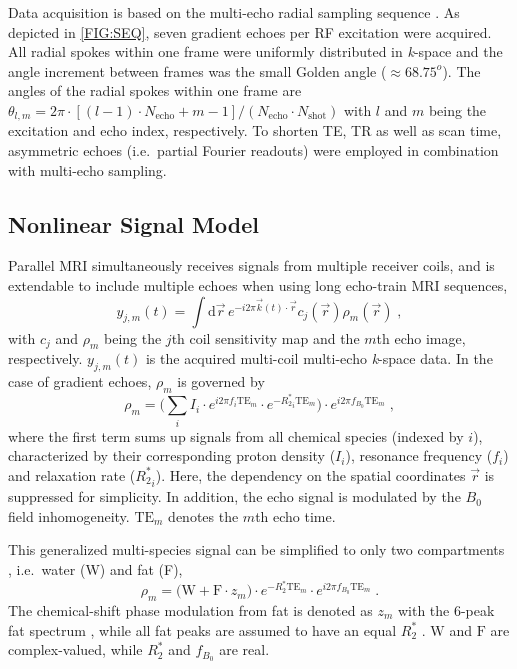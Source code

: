 \documentclass[journal,twoside,web]{ieeecolor}
\begin{document}
Data acquisition is based on the multi-echo radial sampling sequence 
\cite{tan_2019_mobawf}. 
As depicted in \cref{FIG:SEQ}, seven gradient echoes per RF excitation 
were acquired. 
All radial spokes within one frame were uniformly distributed in \textit{k}-space 
and the angle increment between frames was the small Golden angle 
\cite{winkelmann_2007_golden} ($\approx 68.75^o$).
The angles of the radial spokes within one frame are 
$\theta_{l,m} = 2\pi \cdot [ (l-1) \cdot N_\text{echo} + m - 1 ] / (N_\text{echo} \cdot N_\text{shot})$ 
with $l$ and $m$ being the excitation and echo index, respectively. 
To shorten TE, TR as well as scan time, 
asymmetric echoes (i.e.~partial Fourier readouts) \cite{untenberger_2016_asym} 
were employed in combination with multi-echo sampling.



\subsection{Nonlinear Signal Model}

Parallel MRI \cite{roemer_1990_pi,pruessmann_1999_sense,griswold_2002_grappa} 
simultaneously receives signals from multiple receiver coils, 
and is extendable to include multiple echoes when using long echo-train MRI sequences,
\begin{equation} \label{EQU:y_pimeco}
y_{j,m}(t) = \int \text{d} \vec{r} \, e^{-i 2\pi \vec{k} (t) \cdot \vec{r} } c_j(\vec{r}) \rho_m(\vec{r}) \;,
\end{equation}
with $c_j$ and $\rho_m$ being the $j$th coil sensitivity map and the $m$th echo image, respectively. 
$y_{j,m}(t)$ is the acquired multi-coil multi-echo \textit{k}-space data.
In the case of gradient echoes, $\rho_m$ is governed by
\begin{equation} \label{EQU:meco_mspec}
\rho_m = \bigg( \sum_i I_i \cdot e^{i2\pi f_i \text{TE}_m} \cdot e^{-{R_2^*}_i \text{TE}_m} \bigg) \cdot e^{i2\pi f_{B_0} \text{TE}_m} \; ,
\end{equation}
where the first term sums up signals from all chemical species (indexed by $i$), 
characterized by their corresponding proton density ($I_i$), 
resonance frequency ($f_i$) and relaxation rate (${R_2^*}_i$). 
Here, the dependency on the spatial coordinates $\vec{r}$ is suppressed for simplicity.
In addition, the echo signal is modulated by the $B_0$ field inhomogeneity. 
$\text{TE}_m$ denotes the $m$th echo time.

This generalized multi-species signal can be simplified to only two compartments \cite{yu_2007_t2sideal,yu_2008_mft2sideal,chebrolu_2010_indiwf}, 
i.e.~water (W) and fat (F), 
\begin{equation} \label{EQU:meco_wfr2s}
\rho_m = \bigg( \text{W} + \text{F} \cdot z_m \bigg) \cdot e^{- R_2^* \text{TE}_m} \cdot e^{i2\pi f_{B_0} \text{TE}_m} \; .
\end{equation}
The chemical-shift phase modulation from fat is denoted as 
$z_m$ with the 6-peak fat spectrum \cite{yu_2008_mft2sideal}, 
while all fat peaks are assumed to have an equal $R_2^*$ \cite{reeder_2012_perfr2s}.
$\text{W}$ and $\text{F}$ are complex-valued, 
while $R_2^*$ and $f_{B_0}$ are real. 
\end{document}
